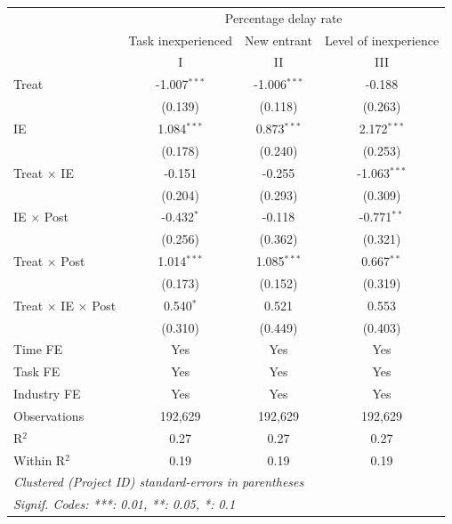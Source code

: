 \documentclass[
]{article}
\begin{document}
\begin{tabular}{lccc}
   \toprule
    & \multicolumn{3}{c}{Percentage delay rate}\\
                                     & Task inexperienced & New entrant    & Level of inexperience \\   
                                     & I                  & II             & III\\  
   Treat                             & -1.007$^{***}$     & -1.006$^{***}$ & -0.188\\   
                                     & (0.139)            & (0.118)        & (0.263)\\   
   IE                                & 1.084$^{***}$      & 0.873$^{***}$  & 2.172$^{***}$\\   
                                     & (0.178)            & (0.240)        & (0.253)\\   
   Treat $\times$ IE                 & -0.151             & -0.255         & -1.063$^{***}$\\   
                                     & (0.204)            & (0.293)        & (0.309)\\   
   IE $\times$ Post                  & -0.432$^{*}$       & -0.118         & -0.771$^{**}$\\   
                                     & (0.256)            & (0.362)        & (0.321)\\   
   Treat $\times$ Post               & 1.014$^{***}$      & 1.085$^{***}$  & 0.667$^{**}$\\   
                                     & (0.173)            & (0.152)        & (0.319)\\   
   Treat $\times$ IE $\times$ Post   & 0.540$^{*}$        & 0.521          & 0.553\\   
                                     & (0.310)            & (0.449)        & (0.403)\\   
   Time FE                           & Yes                & Yes            & Yes\\  
   Task FE                           & Yes                & Yes            & Yes\\  
   Industry FE                       & Yes                & Yes            & Yes\\  
   Observations                      & 192,629            & 192,629        & 192,629\\  
   R$^2$                             & 0.27               & 0.27           & 0.27\\  
   Within R$^2$                      & 0.19               & 0.19           & 0.19\\  
   \midrule
   \multicolumn{4}{l}{\emph{Clustered (Project ID) standard-errors in parentheses}}\\
   \multicolumn{4}{l}{\emph{Signif. Codes: ***: 0.01, **: 0.05, *: 0.1}}\\
\end{tabular}
\par\endgroup
\end{document}
